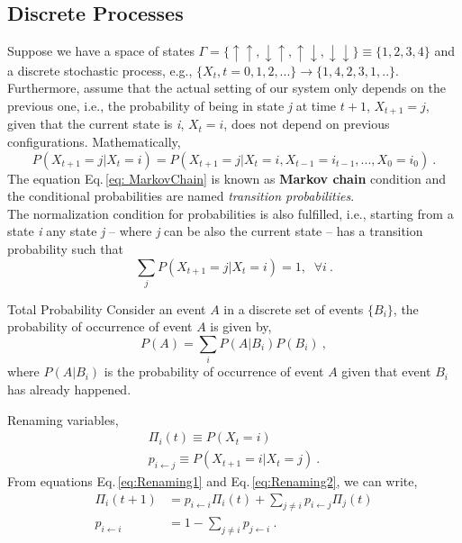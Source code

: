 \subsection{Discrete Processes}
Suppose we have a space of states $\Gamma = \{\uparrow \uparrow,\downarrow \uparrow,\uparrow \downarrow,\downarrow \downarrow \} \equiv \{1, 2, 3, 4 \}$ and a discrete stochastic process, e.g., $\{X_{t}, t= 0,1,2,...\} \rightarrow \{1,4,2,3,1,..\}$. Furthermore, assume that the actual setting of our system only depends on the previous one, i.e., the probability of being in state \textit{j} at time $t+1$, $X_{t+1}= j$, given that the current state is \textit{i}, $X_{t} = i$, does not depend on previous configurations. Mathematically,
\begin{equation}
\label{eq: MarkovChain}
    P\left(X_{t+1} = j | X_{t} = i\right) = P\left(X_{t+1}=j | X_{t} = i, X_{t-1} =i_{t-1},...,X_{0} = i_{0}\right)\ .
\end{equation}
The equation Eq.\,\eqref{eq: MarkovChain} is known as \textbf{Markov chain} condition and the conditional probabilities are named \textit{transition probabilities}.\\
The normalization condition for probabilities is also fulfilled, i.e., starting from a state  \textit{i} any state \textit{j} -- where \textit{j} can be also the current state -- has a transition probability such that
\begin{equation}
    \sum_{j}P\left(X_{t+1} = j | X_{t} = i\right) = 1, \;\; \forall i\ .
\end{equation}
\begin{theorem}{Total Probability}{}
Consider an event $A$ in a discrete set of events $\{B_{i}\}$, the probability of occurrence of event $A$ is given by,
\begin{equation}
    P\left(A\right) = \sum_{i}P\left(A|B_{i}\right)P\left(B_{i}\right)\ ,
\end{equation}
where $P\left(A|B_{i}\right)$ is the probability of occurrence of event $A$ given that event $B_{i}$ has already happened. 
\end{theorem}
Renaming variables,
\begin{align}
    \label{eq:Renaming1}
    \Pi_{i}(t) \equiv P\left(X_{t} = i\right) \\
    \label{eq:Renaming2}
    p_{i \leftarrow j} \equiv P\left(X_{t+1} = i | X_{t}=j\right)\ .
\end{align}
From equations Eq.\,\eqref{eq:Renaming1} and Eq.\,\eqref{eq:Renaming2}, we can write,
\begin{align}
        \Pi_{i}(t+1) &= p_{i \leftarrow i}\Pi_{i}(t) + \sum_{j \neq i} p_{i \leftarrow j}\Pi_{j}(t) \\ 
        p_{i \leftarrow i} &= 1 - \sum_{j\neq i}p_{j \leftarrow i}\ .
\end{align}
